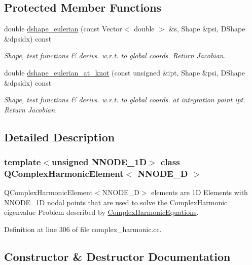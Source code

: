 \subsection*{Protected Member Functions}
\begin{DoxyCompactItemize}
\item 
double \hyperlink{classQComplexHarmonicElement_a7c97d4e8c5433a44640d30c936d69ffb}{dshape\+\_\+eulerian} (const Vector$<$ double $>$ \&s, Shape \&psi, D\+Shape \&dpsidx) const
\begin{DoxyCompactList}\small\item\em Shape, test functions \& derivs. w.\+r.\+t. to global coords. Return Jacobian. \end{DoxyCompactList}\item 
double \hyperlink{classQComplexHarmonicElement_a3f8d1d9396135d4d86f416dcf6c23904}{dshape\+\_\+eulerian\+\_\+at\+\_\+knot} (const unsigned \&ipt, Shape \&psi, D\+Shape \&dpsidx) const
\begin{DoxyCompactList}\small\item\em Shape, test functions \& derivs. w.\+r.\+t. to global coords. at integration point ipt. Return Jacobian. \end{DoxyCompactList}\end{DoxyCompactItemize}


\subsection{Detailed Description}
\subsubsection*{template$<$unsigned N\+N\+O\+D\+E\+\_\+1D$>$\newline
class Q\+Complex\+Harmonic\+Element$<$ N\+N\+O\+D\+E\+\_\+D $>$}

Q\+Complex\+Harmonic\+Element$<$\+N\+N\+O\+D\+E\+\_\+D$>$ elements are 1D Elements with N\+N\+O\+D\+E\+\_\+1D nodal points that are used to solve the Complex\+Harmonic eigenvalue Problem described by \hyperlink{classComplexHarmonicEquations}{Complex\+Harmonic\+Equations}. 

Definition at line 306 of file complex\+\_\+harmonic.\+cc.



\subsection{Constructor \& Destructor Documentation}
\mbox{\label{classQComplexHarmonicElement_a9f1e88c4b5c7031d77c6f6dd3758de2a}} 
